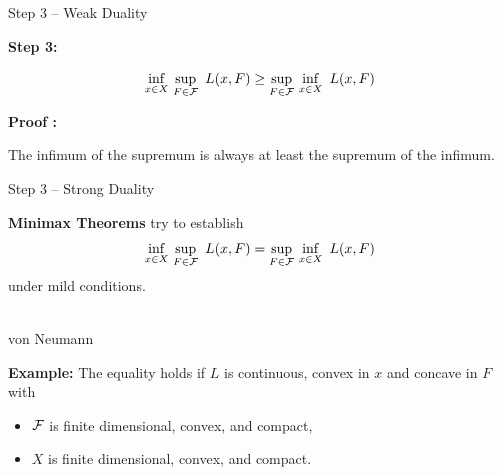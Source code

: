 \documentclass[9pt]{beamer}
\begin{document}
\begin{frame}{Step 3 -- Weak Duality}

  \textbf{Step 3:}

  \[
    \inf_{x\in X}\, \sup_{F\in \mathcal F} ~ L(x, F) \geq \sup_{F\in \mathcal F}\,\inf_{x\in X} ~L(x, F)
  \]

  \vfill
  
  \textbf{Proof :}
  
  The infimum of the supremum is always at least the supremum of the infimum.
  
\end{frame}


\begin{frame}{Step 3 -- Strong Duality}

  \textbf{Minimax Theorems} try to establish
  \[
    \inf_{x\in X}\, \sup_{F\in \mathcal F} ~ L(x, F) = \sup_{F\in \mathcal F}\,\inf_{x\in X} ~L(x, F)
  \]
  under mild conditions.

  \vfill

  \\
  von Neumann

  \vfill
  
  \textbf{Example:} The equality holds if $L$ is continuous, convex in $x$ and concave in $F$ with
  \begin{itemize}
  \item $\mathcal F$ is finite dimensional, convex, and compact,
  \item $X$ is finite dimensional, convex, and compact.
  \end{itemize}

  \vfill

\end{frame}
\end{document}
